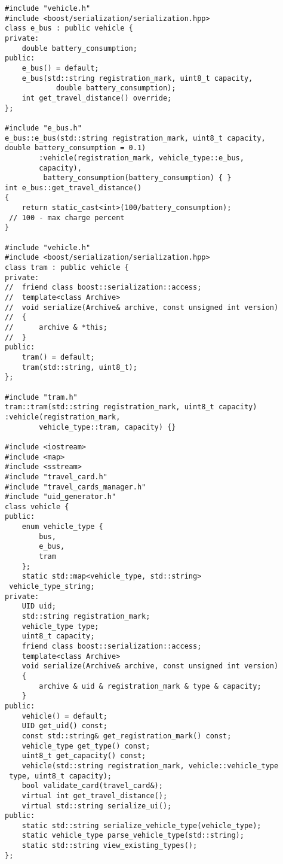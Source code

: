 \begin{verbatim}
#include "vehicle.h"
#include <boost/serialization/serialization.hpp>
class e_bus : public vehicle {
private:
	double battery_consumption;
public:
	e_bus() = default;
	e_bus(std::string registration_mark, uint8_t capacity,
			double battery_consumption);
	int get_travel_distance() override;
};

#include "e_bus.h"
e_bus::e_bus(std::string registration_mark, uint8_t capacity,
double battery_consumption = 0.1)
		:vehicle(registration_mark, vehicle_type::e_bus,
		capacity),
		 battery_consumption(battery_consumption) { }
int e_bus::get_travel_distance()
{
	return static_cast<int>(100/battery_consumption); 
 // 100 - max charge percent
}

#include "vehicle.h"
#include <boost/serialization/serialization.hpp>
class tram : public vehicle {
private:
//	friend class boost::serialization::access;
//	template<class Archive>
//	void serialize(Archive& archive, const unsigned int version)
//	{
//		archive & *this;
//	}
public:
	tram() = default;
	tram(std::string, uint8_t);
};

#include "tram.h"
tram::tram(std::string registration_mark, uint8_t capacity)
:vehicle(registration_mark,
		vehicle_type::tram, capacity) {}

#include <iostream>
#include <map>
#include <sstream>
#include "travel_card.h"
#include "travel_cards_manager.h"
#include "uid_generator.h"
class vehicle {
public:
	enum vehicle_type {
		bus,
		e_bus,
		tram
	};
	static std::map<vehicle_type, std::string>
 vehicle_type_string;
private:
	UID uid;
	std::string registration_mark;
	vehicle_type type;
	uint8_t capacity;
	friend class boost::serialization::access;
	template<class Archive>
	void serialize(Archive& archive, const unsigned int version)
	{
		archive & uid & registration_mark & type & capacity;
	}
public:
	vehicle() = default;
	UID get_uid() const;
	const std::string& get_registration_mark() const;
	vehicle_type get_type() const;
	uint8_t get_capacity() const;
	vehicle(std::string registration_mark, vehicle::vehicle_type
 type, uint8_t capacity);
	bool validate_card(travel_card&);
	virtual int get_travel_distance();
	virtual std::string serialize_ui();
public:
	static std::string serialize_vehicle_type(vehicle_type);
	static vehicle_type parse_vehicle_type(std::string);
	static std::string view_existing_types();
};


\end{verbatim}
